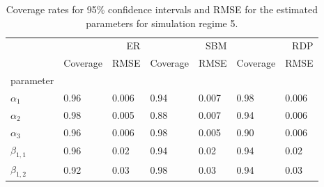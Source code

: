 \begin{table}[ht]
\centering
\caption{Coverage rates for 95\% confidence intervals and RMSE for the estimated parameters for simulation regime 5.}
\label{tab:regime_5_params}
\begin{tabular}{lllllll}
\toprule
 & \multicolumn{2}{r}{ER} & \multicolumn{2}{r}{SBM} & \multicolumn{2}{r}{RDP} \\
 & Coverage & RMSE & Coverage & RMSE & Coverage & RMSE \\
parameter &  &  &  &  &  &  \\
\midrule
$\alpha_{1}$ & 0.96 & 0.006 & 0.94 & 0.007 & 0.98 & 0.006 \\
$\alpha_{2}$ & 0.98 & 0.005 & 0.88 & 0.007 & 0.94 & 0.006 \\
$\alpha_{3}$ & 0.96 & 0.006 & 0.98 & 0.005 & 0.90 & 0.006 \\
$\beta_{1,1}$ & 0.96 & 0.02 & 0.94 & 0.02 & 0.94 & 0.02 \\
$\beta_{1,2}$ & 0.92 & 0.03 & 0.98 & 0.03 & 0.94 & 0.03 \\
\bottomrule
\end{tabular}

\end{table}
